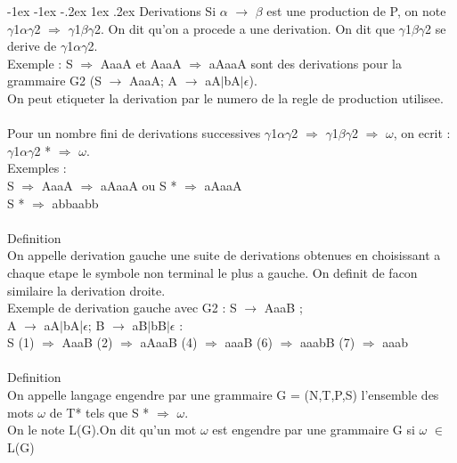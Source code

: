 \documentclass[5pt]{article}
\makeatletter
\renewcommand{\subsubsection}{\@startsection {section}{1}{\z@}%
             {-1ex \@plus -1ex \@minus -.2ex}%
             {1ex \@plus.2ex}%
             {\normalfont\scriptsize\sffamily\bfseries}}
\makeatother
\begin{document}
\begin{scriptsize}
\subsubsection{Derivations}
Si $\alpha$ $\rightarrow$ $\beta$ est une production de P, on note $\gamma$1$\alpha\gamma$2 $\Rightarrow$ $\gamma$1$\beta\gamma$2. On dit qu’on a procede a une derivation. On dit que $\gamma$1$\beta\gamma$2 se derive de $\gamma$1$\alpha\gamma$2.\\
Exemple : S $\Rightarrow$ AaaA et AaaA $\Rightarrow$ aAaaA sont des derivations pour la grammaire G2 (S $\rightarrow$ AaaA; A $\rightarrow$ aA$\mid$bA$\mid\epsilon$).\\
On peut etiqueter la derivation par le numero de la regle de production utilisee.\\
\\
Pour un nombre fini de derivations successives $\gamma$1$\alpha\gamma$2 $\Rightarrow$ $\gamma$1$\beta\gamma$2 $\Rightarrow$ $\omega$, on ecrit : $\gamma$1$\alpha\gamma$2 * $\Rightarrow$ $\omega$.\\
Exemples :\\
S $\Rightarrow$ AaaA $\Rightarrow$ aAaaA ou S * $\Rightarrow$ aAaaA\\
S * $\Rightarrow$ abbaabb\\
\\
Definition\\
On appelle derivation gauche une suite de derivations obtenues en choisissant a chaque etape le symbole non terminal le plus a gauche. On definit de facon similaire la derivation droite.\\
Exemple de derivation gauche avec G2 : S $\rightarrow$ AaaB ;\\
A $\rightarrow$ aA$\mid$bA|$\epsilon$; B $\rightarrow$ aB$\mid$bB$\mid\epsilon$ :\\
S (1) $\Rightarrow$ AaaB (2) $\Rightarrow$ aAaaB (4) $\Rightarrow$ aaaB (6) $\Rightarrow$ aaabB (7) $\Rightarrow$ aaab\\
\\
Definition\\
On appelle langage engendre par une grammaire G = (N,T,P,S) l’ensemble des mots $\omega$ de T* tels que S * $\Rightarrow$ $\omega$.\\
On le note L(G).On dit qu’un mot $\omega$ est engendre par une grammaire G si $\omega$ $\in$ L(G)\\

\end{scriptsize}
\end{document}
